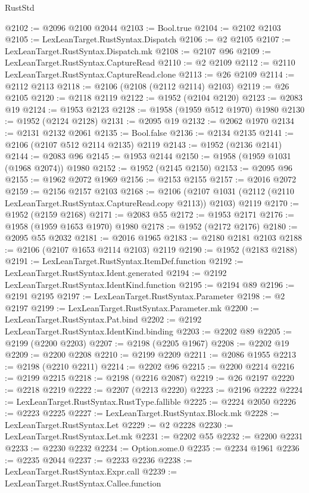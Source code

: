 \begin{lexlean}{RustStd}
\begin{coremodule}
@2102 := @2096 @2100 @2044
@2103 := Bool.true
@2104 := @2102 @2103
@2105 := LexLeanTarget.RustSyntax.Dispatch
@2106 := @2 @2105
@2107 := LexLeanTarget.RustSyntax.Dispatch.mk
@2108 := @2107 @96
@2109 := LexLeanTarget.RustSyntax.CaptureRead
@2110 := @2 @2109
@2112 := @2110 LexLeanTarget.RustSyntax.CaptureRead.clone
@2113 := @26 @2109
@2114 := @2112 @2113
@2118 := @2106 (@2108 (@2112 @2114) @2103)
@2119 := @26 @2105
@2120 := @2118 @2119
@2122 := @1952 (@2104 @2120)
@2123 := @2083 @19
@2124 := @1953 @2123
@2128 := @1958 (@1959 @512 @1970) @1980
@2130 := @1952 (@2124 @2128)
@2131 := @2095 @19
@2132 := @2062 @1970
@2134 := @2131 @2132 @2061
@2135 := Bool.false
@2136 := @2134 @2135
@2141 := @2106 (@2107 @512 @2114 @2135) @2119
@2143 := @1952 (@2136 @2141)
@2144 := @2083 @96
@2145 := @1953 @2144
@2150 := @1958 (@1959 @1031 (@1968 @2074)) @1980
@2152 := @1952 (@2145 @2150)
@2153 := @2095 @96
@2155 := @1962 @2072 @1969
@2156 := @2153 @2155
@2157 := @2016 @2072
@2159 := @2156 @2157 @2103
@2168 := @2106
    (@2107 @1031 (@2112 (@2110 LexLeanTarget.RustSyntax.CaptureRead.copy @2113)) @2103)
    @2119
@2170 := @1952 (@2159 @2168)
@2171 := @2083 @55
@2172 := @1953 @2171
@2176 := @1958 (@1959 @1653 @1970) @1980
@2178 := @1952 (@2172 @2176)
@2180 := @2095 @55 @2032
@2181 := @2016 @1965
@2183 := @2180 @2181 @2103
@2188 := @2106 (@2107 @1653 @2114 @2103) @2119
@2190 := @1952 (@2183 @2188)
@2191 := LexLeanTarget.RustSyntax.ItemDef.function
@2192 := LexLeanTarget.RustSyntax.Ident.generated
@2194 := @2192 LexLeanTarget.RustSyntax.IdentKind.function
@2195 := @2194 @89
@2196 := @2191 @2195
@2197 := LexLeanTarget.RustSyntax.Parameter
@2198 := @2 @2197
@2199 := LexLeanTarget.RustSyntax.Parameter.mk
@2200 := LexLeanTarget.RustSyntax.Pat.bind
@2202 := @2192 LexLeanTarget.RustSyntax.IdentKind.binding
@2203 := @2202 @89
@2205 := @2199 (@2200 @2203)
@2207 := @2198 (@2205 @1967)
@2208 := @2202 @19
@2209 := @2200 @2208
@2210 := @2199 @2209
@2211 := @2086 @1955
@2213 := @2198 (@2210 @2211)
@2214 := @2202 @96
@2215 := @2200 @2214
@2216 := @2199 @2215
@2218 := @2198 (@2216 @2087)
@2219 := @26 @2197
@2220 := @2218 @2219
@2222 := @2207 (@2213 @2220)
@2223 := @2196 @2222
@2224 := LexLeanTarget.RustSyntax.RustType.fallible
@2225 := @2224 @2050
@2226 := @2223 @2225
@2227 := LexLeanTarget.RustSyntax.Block.mk
@2228 := LexLeanTarget.RustSyntax.Let
@2229 := @2 @2228
@2230 := LexLeanTarget.RustSyntax.Let.mk
@2231 := @2202 @55
@2232 := @2200 @2231
@2233 := @2230 @2232
@2234 := Option.some.{0}
@2235 := @2234 @1961
@2236 := @2235 @2044
@2237 := @2233 @2236
@2238 := LexLeanTarget.RustSyntax.Expr.call
@2239 := LexLeanTarget.RustSyntax.Callee.function

\end{coremodule}
\end{lexlean}
